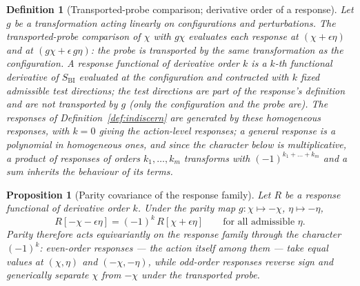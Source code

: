 \documentclass[11pt,a4paper]{article}
\newtheorem{proposition}[theorem]{Proposition}
\newtheorem{definition}[theorem]{Definition}
\newcommand{\chifield}{\chi}
\begin{document}
    \begin{definition}[Transported-probe comparison; derivative order of a response]
      \label{def:equivariant}
      Let $g$ be a transformation acting linearly on configurations and perturbations.
      The \emph{transported-probe comparison} of $\chifield$ with $g\chifield$ evaluates
      each response at $(\chifield + \epsilon\eta)$ and at
      $(g\chifield + \epsilon\, g\eta)$: the probe is transported by the same
      transformation as the configuration.
      A response functional \emph{of derivative order $k$} is a $k$-th functional
      derivative of $S_{\mathrm{BI}}$ evaluated at the configuration and contracted with
      $k$ fixed admissible test directions; the test directions are part of the response's
      definition and are \emph{not} transported by $g$ (only the configuration and the
      probe are).
      The responses of Definition~\ref{def:indiscern} are generated by these homogeneous
      responses, with $k = 0$ giving the action-level responses; a general response is a
      polynomial in homogeneous ones, and since the character below is multiplicative, a
      product of responses of orders $k_1,\dots,k_m$ transforms with $(-1)^{k_1+\dots+k_m}$
      and a sum inherits the behaviour of its terms.
    \end{definition}

    \begin{proposition}[Parity covariance of the response family]
      \label{prop:equivariance}
      Let $R$ be a response functional of derivative order $k$.
      Under the parity map $g:\chifield\mapsto-\chifield$, $\eta\mapsto-\eta$,
      \begin{equation}
        R[-\chifield - \epsilon\eta] = (-1)^{k}\, R[\chifield + \epsilon\eta]
        \qquad\text{for all admissible } \eta.
        \label{eq:parity-equivariance}
      \end{equation}
      Parity therefore acts equivariantly on the response family through the character
      $(-1)^{k}$: even-order responses --- the action itself among them --- take equal
      values at $(\chifield,\eta)$ and $(-\chifield,-\eta)$, while odd-order responses
      reverse sign and generically separate $\chifield$ from $-\chifield$ under the
      transported probe.
    \end{proposition}
\end{document}
